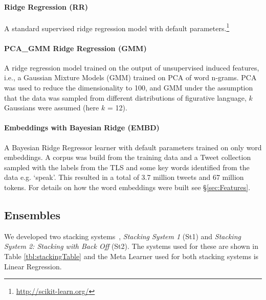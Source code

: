 \documentclass[11pt,letterpaper]{article}
\begin{document}
\paragraph{Ridge Regression ({\sc RR})} A standard supervised ridge regression model with default parameters.\footnote{\url{http://scikit-learn.org/}}

\paragraph{PCA\_GMM Ridge Regression ({\sc GMM})} A ridge regression model trained on the output of 
unsupervised induced features, i.e., a Gaussian Mixture Models (GMM) trained on PCA of word n-grams.
PCA was used to reduce the dimensionality to 100, and GMM under the assumption that the data was sampled from different distributions of figurative language, $k$ Gaussians were assumed (here $k$ = 12). 
\paragraph{Embeddings with Bayesian Ridge ({\sc EMBD})} A Bayesian Ridge Regressor learner with default parameters trained on only word embeddings. 
A corpus was build from the training data and a Tweet collection sampled with the labels from the TLS and some key words identified from the data e.g. `speak'. 
This resulted in a total of 3.7 million tweets and 67 million tokens. 
For details on how the word embeddings were built see \S\ref{sec:Features}.



\subsection{Ensembles}\label{subsec:Ensembles}
We developed two stacking systems~\cite{Wolpert:1992}, {\it Stacking System 1} ({\sc St1}) and {\it Stacking System 2: Stacking with Back Off} ({\sc St2}). The systems used for these are shown in Table  \ref{tbl:stackingTable} and the Meta Learner used for both stacking systems is Linear Regression.
\end{document}
